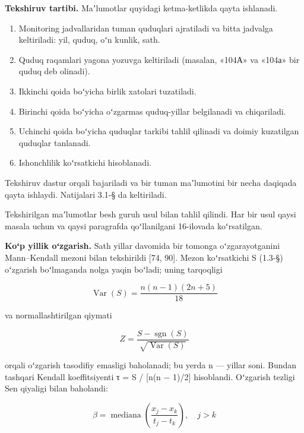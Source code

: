 \textbf{Tekshiruv tartibi.} Maʼlumotlar quyidagi ketma-ketlikda qayta
ishlanadi.

\begin{enumerate}
\def\labelenumi{\arabic{enumi}.}
\tightlist
\item
  Monitoring jadvallaridan tuman quduqlari ajratiladi va bitta jadvalga
  keltiriladi: yil, quduq, oʻn kunlik, sath.
\item
  Quduq raqamlari yagona yozuvga keltiriladi (masalan, «104А» va «104а»
  bir quduq deb olinadi).
\item
  Ikkinchi qoida boʻyicha birlik xatolari tuzatiladi.
\item
  Birinchi qoida boʻyicha oʻzgarmas quduq-yillar belgilanadi va
  chiqariladi.
\item
  Uchinchi qoida boʻyicha quduqlar tarkibi tahlil qilinadi va doimiy
  kuzatilgan quduqlar tanlanadi.
\item
  Ishonchlilik koʻrsatkichi hisoblanadi.
\end{enumerate}

Tekshiruv dastur orqali bajariladi va bir tuman maʼlumotini bir necha
daqiqada qayta ishlaydi. Natijalari 3.1-§ da keltiriladi.


Tekshirilgan maʼlumotlar besh guruh usul bilan tahlil qilindi. Har bir
usul qaysi masala uchun va qaysi paragrafda qoʻllanilgani 16-ilovada
koʻrsatilgan.

\textbf{Koʻp yillik oʻzgarish.} Sath yillar davomida bir tomonga
oʻzgarayotganini Mann--Kendall mezoni bilan tekshirildi {[}74, 90{]}.
Mezon koʻrsatkichi S (1.3-§) oʻzgarish boʻlmaganda nolga yaqin boʻladi;
uning tarqoqligi

\begin{equation}\tag{2.6}
\operatorname{Var}(S) = \frac{n(n-1)(2n+5)}{18}
\end{equation}

va normallashtirilgan qiymati

\begin{equation}\tag{2.7}
Z = \frac{S - \operatorname{sgn}(S)}{\sqrt{\operatorname{Var}(S)}}
\end{equation}

orqali oʻzgarish tasodifiy emasligi baholanadi; bu yerda n --- yillar
soni. Bundan tashqari Kendall koeffitsiyenti τ = S / {[}n(n − 1)/2{]}
hisoblandi. Oʻzgarish tezligi Sen qiyaligi bilan baholandi:

\begin{equation}\tag{2.8}
\beta = \operatorname{mediana} \left( \frac{x_j - x_k}{t_j - t_k} \right), \quad j > k
\end{equation}


